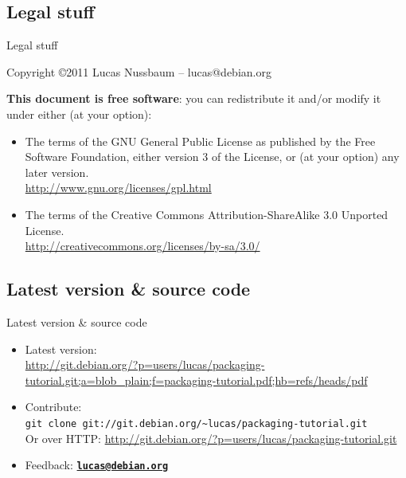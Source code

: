 \documentclass[10pt,final]{beamer}
\begin{document}
\subsection{Legal stuff}
\begin{frame}{Legal stuff}

  Copyright \copyright 2011 Lucas Nussbaum -- lucas@debian.org
  \br

  {\small 
    \textbf{This document is free software}: you can redistribute it and/or modify
    it under either (at your option):
    \hbr
    \begin{itemize}
    \item The terms of the GNU General Public License as published by the Free
      Software Foundation, either version 3 of the License, or
      (at your option) any later version.\\
      \url{http://www.gnu.org/licenses/gpl.html} \br
    \item The terms of the Creative Commons Attribution-ShareAlike 3.0 Unported
      License.\\ 
      \url{http://creativecommons.org/licenses/by-sa/3.0/}
    \end{itemize}
  }
\end{frame}

\subsection{Latest version \& source code}
\begin{frame}{Latest version \& source code}
  \begin{itemize}
  \item Latest version:\\
    {\footnotesize \url{http://git.debian.org/?p=users/lucas/packaging-tutorial.git;a=blob\_plain;f=packaging-tutorial.pdf;hb=refs/heads/pdf}}
  \end{itemize}
  
  \begin{itemize}
  \item Contribute:\\
    \texttt{git clone git://git.debian.org/\~{}lucas/packaging-tutorial.git}\\
    \hbr
    Or over HTTP: \url{http://git.debian.org/?p=users/lucas/packaging-tutorial.git}
    \br
  \item Feedback: \href{mailto:lucas@debian.org}{\textbf{\texttt{lucas@debian.org}}}
  \end{itemize}
\end{frame}
\end{document}
